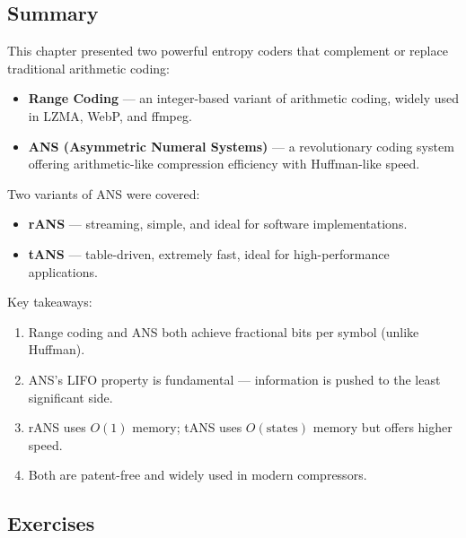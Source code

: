\subsection{Summary}

This chapter presented two powerful entropy coders that complement or replace traditional arithmetic coding:

\begin{itemize}
    \item \textbf{Range Coding} — an integer-based variant of arithmetic coding, widely used in LZMA, WebP, and ffmpeg.
    \item \textbf{ANS (Asymmetric Numeral Systems)} — a revolutionary coding system offering arithmetic-like compression efficiency with Huffman-like speed.
\end{itemize}

Two variants of ANS were covered:

\begin{itemize}
    \item \textbf{rANS} — streaming, simple, and ideal for software implementations.
    \item \textbf{tANS} — table-driven, extremely fast, ideal for high-performance applications.
\end{itemize}

Key takeaways:
\begin{enumerate}
    \item Range coding and ANS both achieve fractional bits per symbol (unlike Huffman).
    \item ANS's LIFO property is fundamental — information is pushed to the least significant side.
    \item rANS uses $O(1)$ memory; tANS uses $O(\text{states})$ memory but offers higher speed.
    \item Both are patent-free and widely used in modern compressors.
\end{enumerate}

\subsection{Exercises}

